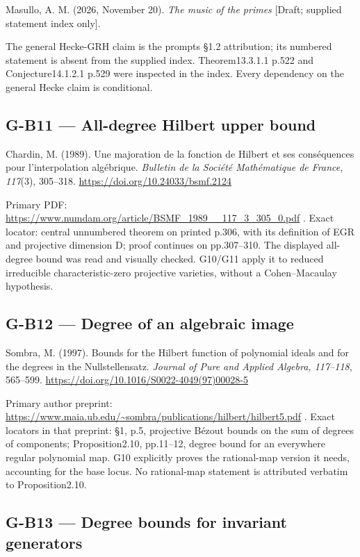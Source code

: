 \documentclass[11pt,a4paper]{article}
\theoremstyle{definition}\newtheorem{definition}{Definition}
\begin{document}
Masullo, A. M. (2026, November 20). \emph{The music of the primes}
{[}Draft; supplied statement index only{]}.

The general Hecke-GRH claim is the prompt\textquotesingle s §1.2
attribution; its numbered statement is absent from the supplied index.
Theorem13.3.1.1 p.522 and Conjecture14.1.2.1 p.529 were inspected in the
index. Every dependency on the general Hecke claim is conditional.

\subsection{G-B11 --- All-degree Hilbert upper
bound}\label{g-b11--all-degree-hilbert-upper-bound}

Chardin, M. (1989). Une majoration de la fonction de Hilbert et ses
conséquences pour l'interpolation algébrique. \emph{Bulletin de la
Société Mathématique de France, 117}(3), 305--318.
\url{https://doi.org/10.24033/bsmf.2124}

Primary PDF:
\url{https://www.numdam.org/article/BSMF_1989__117_3_305_0.pdf} . Exact
locator: central unnumbered theorem on printed p.306, with its
definition of EGR and projective dimension D; proof continues on
pp.307--310. The displayed all-degree bound was read and visually
checked. G10/G11 apply it to reduced irreducible characteristic-zero
projective varieties, without a Cohen--Macaulay hypothesis.

\subsection{G-B12 --- Degree of an algebraic
image}\label{g-b12--degree-of-an-algebraic-image}

Sombra, M. (1997). Bounds for the Hilbert function of polynomial ideals
and for the degrees in the Nullstellensatz. \emph{Journal of Pure and
Applied Algebra, 117--118}, 565--599.
\url{https://doi.org/10.1016/S0022-4049(97)00028-5}

Primary author preprint:
\url{https://www.maia.ub.edu/~sombra/publications/hilbert/hilbert5.pdf}
. Exact locators in that preprint: §1, p.5, projective Bézout bounds on
the sum of degrees of components; Proposition2.10, pp.11--12, degree
bound for an everywhere regular polynomial map. G10 explicitly proves
the rational-map version it needs, accounting for the base locus. No
rational-map statement is attributed verbatim to Proposition2.10.

\subsection{G-B13 --- Degree bounds for invariant
generators}\label{g-b13--degree-bounds-for-invariant-generators}
\end{document}
